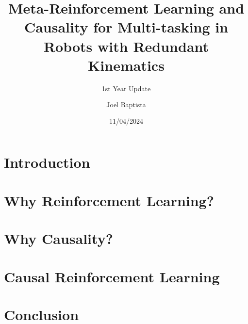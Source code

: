 \documentclass[10pt,xcolor={dvipsnames}]{beamer}
\title[]
{\large Meta-Reinforcement Learning and Causality for Multi-tasking in Robots with Redundant Kinematics}
\subtitle{1st Year Update}
\author[Joel Baptista] %
{Joel Baptista}
\date[2024/04/11] %
{11/04/2024}
\begin{document}
\frame{\titlepage}




\section{Introduction}


\section{Why Reinforcement Learning?}


\section{Why Causality?}


\section{Causal Reinforcement Learning}



\section{Conclusion}




\end{document}
